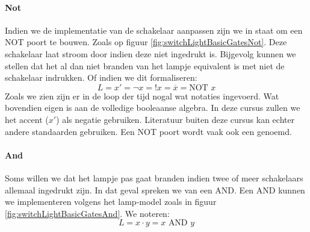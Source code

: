 \paragraph{Not}
Indien we de implementatie van de schakelaar aanpassen zijn we in staat om een NOT poort te bouwen. Zoals op figuur \ref{fig:switchLightBasicGatesNot}. Deze schakelaar laat stroom door indien deze niet ingedrukt is. Bijgevolg kunnen we stellen dat het al dan niet branden van het lampje equivalent is met niet de schakelaar indrukken. Of indien we dit formaliseren:
\begin{equation}
L=x'=\neg x=!x=\overline{x}=\mbox{NOT }x
\end{equation}
Zoals we zien zijn er in de loop der tijd nogal wat notaties ingevoerd. Wat bovendien eigen is aan de volledige booleaanse algebra. In deze cursus zullen we het accent ($x'$) als negatie gebruiken. Literatuur buiten deze cursus kan echter andere standaarden gebruiken. Een NOT poort wordt vaak ook een  genoemd.
\paragraph{And}
Soms willen we dat het lampje pas gaat branden indien twee of meer schakelaars allemaal ingedrukt zijn. In dat geval spreken we van een AND. Een AND kunnen we implementeren volgens het lamp-model zoals in figuur \ref{fig:switchLightBasicGatesAnd}. We noteren:
\begin{equation}
L=x\cdot y=x\mbox{ AND }y
\end{equation}
